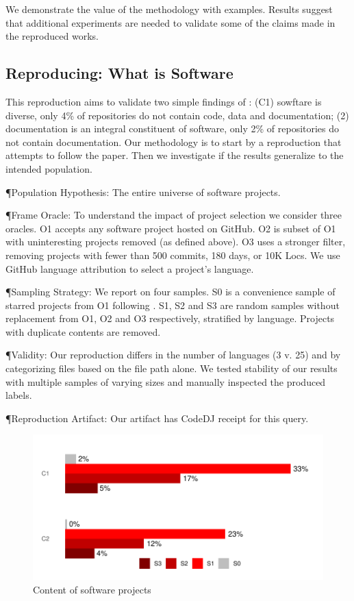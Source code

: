 \documentclass[sigconf,review,anonymous]{acmart}
\newcommand{\gh}{{GitHub}\xspace}
\renewcommand{\dj}{{\textsf{Code{\small{DJ}}}}\xspace}
\begin{document}
We demonstrate the value of the methodology with examples. Results suggest that
additional experiments are needed to validate some of the claims made in the
reproduced works.

\subsection{Reproducing: What is Software}

This reproduction aims to validate two simple findings of \citet{Pfeiffer20}:
(C1) sowftare is diverse, only 4\% of repositories do not contain code, data and
documentation; (2) documentation is an integral constituent of software, only
2\% of repositories do not contain documentation. Our methodology is to start by
a reproduction that attempts to follow the paper. Then we investigate if the
results generalize to the intended population.

\P{Population Hypothesis:} The entire universe of software projects.

\P{Frame Oracle:} To understand the impact of project selection we consider
three oracles. O1 accepts any software project hosted on \gh. O2 is subset of O1
with uninteresting projects removed (as defined above). O3 uses a stronger
filter, removing projects with fewer than 500 commits, 180 days, or 10K Locs. We
use \gh language attribution to select a project's language.

\P{Sampling Strategy:} We report on four samples. S0 is a convenience sample of
starred projects from O1 following \cite{Pfeiffer20}. S1, S2 and S3 are random samples
without replacement from O1, O2 and O3 respectively, stratified by language.
Projects with duplicate contents are removed.

\P{Validity:} Our reproduction differs in the number of languages (3 v. 25) and
by categorizing files based on the file path alone. We tested stability of our
results with multiple samples of varying sizes and manually inspected the produced
labels.

\P{Reproduction Artifact:} Our artifact has \dj receipt for this query.

\vspace{-5mm}

\begin{figure}[!h]
   \includegraphics[width=\columnwidth]{../figs/what-constitutes-software/software.pdf}
\caption{Content of software projects}\label{sw}
\end{figure}
\end{document}
